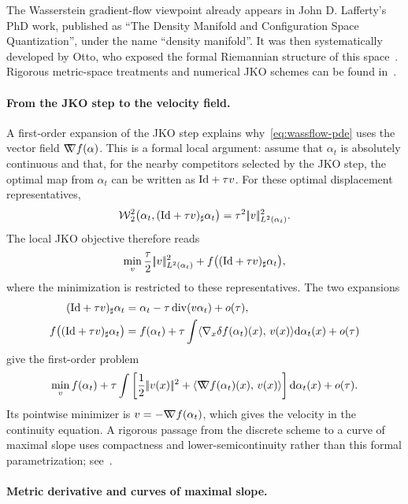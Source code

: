The Wasserstein gradient-flow viewpoint already appears in John D. Lafferty's PhD work, published as ``The Density Manifold and Configuration Space Quantization'', under the name ``density manifold''. It was then systematically developed by Otto, who exposed the formal Riemannian structure of this space~\cite{otto2001geometry}. Rigorous metric-space treatments and numerical JKO schemes can be found in~\cite{ambrosio2006gradient,JDB-JKO,2015-Peyre-siims,gallouet2017jko}.

\paragraph{From the JKO step to the velocity field.}

A first-order expansion of the JKO step explains why~\eqref{eq:wassflow-pde} uses the vector field $\mathord{\nabla\mkern-9.3mu\nabla} f(\alpha)$. This is a formal local argument: assume that $\alpha_t$ is absolutely continuous and that, for the nearby competitors selected by the JKO step, the optimal map from $\alpha_t$ can be written as $\mathrm{Id}+\tau v$. For these optimal displacement representatives,
	\[
		\operatorname{\mathcal{W}}_2^2\bigl(\alpha_t,(\mathrm{Id}+\tau v)_\sharp\alpha_t\bigr)
		=
		\tau^2|\!| v |\!|_{L^2(\alpha_t)}^2.
	\]
The local JKO objective therefore reads
	\[
		\min_v \frac{\tau}{2}|\!| v |\!|_{L^2(\alpha_t)}^2
		+f\bigl((\mathrm{Id}+\tau v)_\sharp\alpha_t\bigr),
	\]
where the minimization is restricted to these representatives. The two expansions
	\begin{align*}
		(\mathrm{Id}+\tau v)_\sharp\alpha_t
		&=
		\alpha_t-\tau\operatorname{div}(v\alpha_t)+o(\tau),\\
		f\bigl((\mathrm{Id}+\tau v)_\sharp\alpha_t\bigr)
		&=
		f(\alpha_t)
		+\tau\int\langle \nabla_x\delta f(\alpha_t)(x),\,v(x)\rangle\mathrm{d}\alpha_t(x)
		+o(\tau)
	\end{align*}
give the first-order problem
	\[
		\min_v f(\alpha_t)
		+\tau\int\left[
			\frac12|\!| v(x) |\!|^2
			+\langle \mathord{\nabla\mkern-9.3mu\nabla} f(\alpha_t)(x),\,v(x)\rangle
		\right]\mathrm{d}\alpha_t(x)
		+o(\tau).
	\]
Its pointwise minimizer is $v=-\mathord{\nabla\mkern-9.3mu\nabla} f(\alpha_t)$, which gives the velocity in the continuity equation. A rigorous passage from the discrete scheme to a curve of maximal slope uses compactness and lower-semicontinuity rather than this formal parametrization; see~\cite{JDB-JKO,ambrosio2006gradient}.

\paragraph{Metric derivative and curves of maximal slope.}

